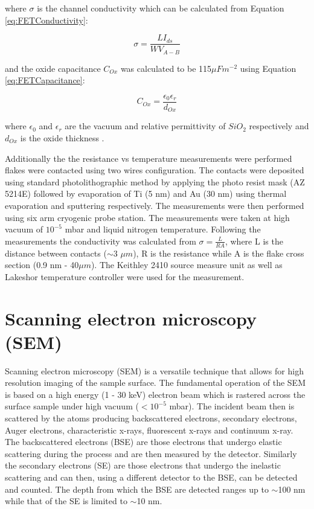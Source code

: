 where $\sigma$ is the channel conductivity which can be calculated from Equation \ref{eq:FETConductivity}:

\begin{equation}
\sigma = \frac{LI_{ds}}{W V_{A-B}}
\label{eq:FETConductivity}
\end{equation}

and the oxide capacitance $C_{Ox}$ was calculated to be 115$\mu F m^{-2}$ using Equation \ref{eq:FETCapacitance}:

\begin{equation}
C_{Ox} = \frac{{\epsilon}_0{\epsilon}_r}{d_{Ox}}
\label{eq:FETCapacitance}
\end{equation}

where ${\epsilon}_0$ and ${\epsilon}_r$ are the vacuum and relative permittivity of $SiO_2$ respectively and $d_{Ox}$ is the oxide thickness \cite{Sze2006}.

Additionally the the resistance vs temperature measurements were performed flakes were contacted using two wires configuration. The contacts were deposited using standard photolithographic method by applying the photo resist mask (AZ 5214E) followed by evaporation of Ti (5 nm) and Au (30 nm) using thermal evaporation and sputtering respectively. The measurements were then performed using six arm cryogenic probe station. The measurements were taken at high vacuum of $10^{-5}$ mbar and liquid nitrogen temperature. Following the measurements the conductivity was calculated from $\sigma = \frac{L}{RA}$, where L is the distance between contacts ($\sim$3 $\mu m$), R is the resistance while A is the flake cross section (0.9 nm - 40$\mu m$). The Keithley 2410 source measure unit as well as Lakeshor temperature controller were used for the measurement.

\section{Scanning electron microscopy (SEM)}

Scanning electron microscopy (SEM) is a versatile technique that allows for high resolution imaging of the sample surface. The fundamental operation of the SEM is based on a high energy (1 - 30 keV) electron beam which is rastered across the surface sample under high vacuum ($<10^{-5}$ mbar). The incident beam then is scattered by the atoms producing backscattered electrons, secondary electrons, Auger electrons, characteristic x-rays, fluorescent x-rays and continuum x-ray. The backscattered electrons (BSE) are those electrons that undergo elastic scattering during the process and are then measured by the detector. Similarly the secondary electrons (SE) are those electrons that undergo the inelastic scattering and can then, using a different detector to the BSE, can be detected and counted. The depth from which the BSE are detected ranges up to $\sim$100 nm while that of the SE is limited to $\sim$10 nm.


